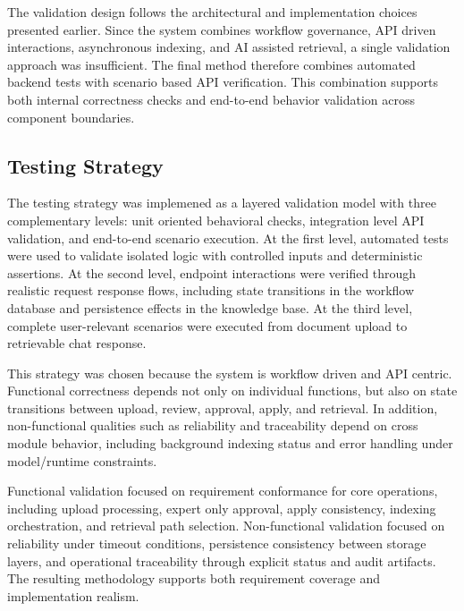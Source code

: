 \vspace{0.4cm}

The validation design follows the architectural and implementation choices presented earlier. Since the system combines workflow governance, API driven interactions, asynchronous indexing, and AI assisted retrieval, a single validation approach was insufficient. The final method therefore combines automated backend tests with scenario based API verification. This combination supports both internal correctness checks and end-to-end behavior validation across component boundaries.



\subsection{Testing Strategy}

The testing strategy was implemened as a layered validation model with three complementary levels: unit oriented behavioral checks, integration level API validation, and end-to-end scenario execution. At the first level, automated tests were used to validate isolated logic with controlled inputs and deterministic assertions. At the second level, endpoint interactions were verified through realistic request response flows, including state transitions in the workflow database and persistence effects in the knowledge base. At the third level, complete user-relevant scenarios were executed from document upload to retrievable chat response.

\vspace{0.4cm}

This strategy was chosen because the system is workflow driven and API centric. Functional correctness depends not only on individual functions, but also on state transitions between upload, review, approval, apply, and retrieval. In addition, non-functional qualities such as reliability and traceability depend on cross module behavior, including background indexing status and error handling under model/runtime constraints.

\vspace{0.4cm}

Functional validation focused on requirement conformance for core operations, including upload processing, expert only approval, apply consistency, indexing orchestration, and retrieval path selection. Non-functional validation focused on reliability under timeout conditions, persistence consistency between storage layers, and operational traceability through explicit status and audit artifacts. The resulting methodology supports both requirement coverage and implementation realism.


